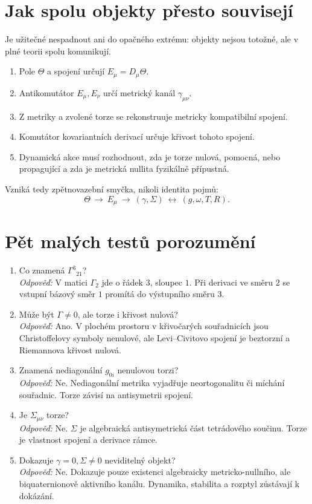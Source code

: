 \section{Jak spolu objekty přesto souvisejí}
Je užitečné nespadnout ani do opačného extrému: objekty nejsou totožné, ale v
plné teorii spolu komunikují.

\begin{enumerate}[leftmargin=*]
  \item Pole $\Theta$ a spojení určují $E_\mu=D_\mu\Theta$.
  \item Antikomutátor $E_\mu,E_\nu$ určí metrický kanál $\gamma_{\mu\nu}$.
  \item Z metriky a zvolené torze se rekonstruuje metricky kompatibilní spojení.
  \item Komutátor kovariantních derivací určuje křivost tohoto spojení.
  \item Dynamická akce musí rozhodnout, zda je torze nulová, pomocná, nebo
        propagující a zda je metrická nullita fyzikálně přípustná.
\end{enumerate}

Vzniká tedy zpětnovazební smyčka, nikoli identita pojmů:
\[
  \Theta\ \longrightarrow\ E_\mu
  \ \longrightarrow\ (\gamma,\Sigma)
  \ \longleftrightarrow\ (g,\omega,T,R).
\]

\section{Pět malých testů porozumění}

\begin{enumerate}[leftmargin=*]
\item Co znamená $\Gamma^3{}_{21}$?\\
\emph{Odpověď:} V matici $\Gamma_2$ jde o řádek $3$, sloupec $1$. Při derivaci
ve směru $2$ se vstupní bázový směr $1$ promítá do výstupního směru $3$.

\item Může být $\Gamma\neq0$, ale torze i křivost nulová?\\
\emph{Odpověď:} Ano. V plochém prostoru v křivočarých souřadnicích jsou
Christoffelovy symboly nenulové, ale Levi--Civitovo spojení je beztorzní a
Riemannova křivost nulová.

\item Znamená nediagonální $g_{0i}$ nenulovou torzi?\\
\emph{Odpověď:} Ne. Nediagonální metrika vyjadřuje neortogonalitu či míchání
souřadnic. Torze závisí na antisymetrii spojení.

\item Je $\Sigma_{\mu\nu}$ torze?\\
\emph{Odpověď:} Ne. $\Sigma$ je algebraická antisymetrická část tetrádového
součinu. Torze je vlastnost spojení a derivace rámce.

\item Dokazuje $\gamma=0,\Sigma\neq0$ neviditelný objekt?\\
\emph{Odpověď:} Ne. Dokazuje pouze existenci algebraicky metricko-nullního, ale
biquaternionově aktivního kanálu. Dynamika, stabilita a rozptyl zůstávají k
dokázání.
\end{enumerate}

